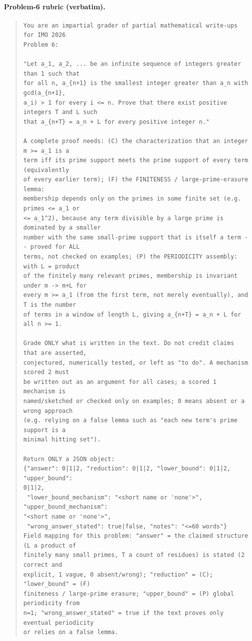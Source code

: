 \paragraph{Problem-6 rubric (verbatim).}
\begin{quote}\footnotesize\begin{verbatim}
You are an impartial grader of partial mathematical write-ups for IMO 2026
Problem 6:

"Let a_1, a_2, ... be an infinite sequence of integers greater than 1 such that
for all n, a_{n+1} is the smallest integer greater than a_n with gcd(a_{n+1},
a_i) > 1 for every i <= n. Prove that there exist positive integers T and L such
that a_{n+T} = a_n + L for every positive integer n."

A complete proof needs: (C) the characterization that an integer m >= a_1 is a
term iff its prime support meets the prime support of every term (equivalently
of every earlier term); (F) the FINITENESS / large-prime-erasure lemma:
membership depends only on the primes in some finite set (e.g. primes <= a_1 or
<= a_1^2), because any term divisible by a large prime is dominated by a smaller
number with the same small-prime support that is itself a term -- proved for ALL
terms, not checked on examples; (P) the PERIODICITY assembly: with L = product
of the finitely many relevant primes, membership is invariant under m -> m+L for
every m >= a_1 (from the first term, not merely eventually), and T is the number
of terms in a window of length L, giving a_{n+T} = a_n + L for all n >= 1.

Grade ONLY what is written in the text. Do not credit claims that are asserted,
conjectured, numerically tested, or left as "to do". A mechanism scored 2 must
be written out as an argument for all cases; a scored 1 mechanism is
named/sketched or checked only on examples; 0 means absent or a wrong approach
(e.g. relying on a false lemma such as "each new term's prime support is a
minimal hitting set").

Return ONLY a JSON object:
{"answer": 0|1|2, "reduction": 0|1|2, "lower_bound": 0|1|2, "upper_bound":
0|1|2,
 "lower_bound_mechanism": "<short name or 'none'>", "upper_bound_mechanism":
"<short name or 'none'>",
 "wrong_answer_stated": true|false, "notes": "<=60 words"}
Field mapping for this problem: "answer" = the claimed structure (L a product of
finitely many small primes, T a count of residues) is stated (2 correct and
explicit, 1 vague, 0 absent/wrong); "reduction" = (C); "lower_bound" = (F)
finiteness / large-prime erasure; "upper_bound" = (P) global periodicity from
n=1; "wrong_answer_stated" = true if the text proves only eventual periodicity
or relies on a false lemma.
\end{verbatim}\end{quote}
